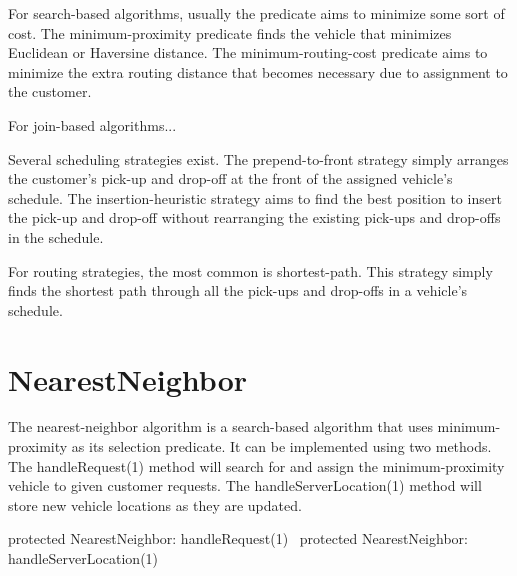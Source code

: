 For search-based algorithms, usually the predicate aims to minimize some sort
of cost. The minimum-proximity predicate finds the vehicle that minimizes
Euclidean or Haversine distance. The minimum-routing-cost predicate aims to
minimize the extra routing distance that becomes necessary due to assignment to
the customer.

For join-based algorithms...

Several scheduling strategies exist. The prepend-to-front strategy
simply arranges the customer's pick-up and drop-off at the front of the
assigned vehicle's schedule. The insertion-heuristic strategy aims to
find the best position to insert the pick-up and drop-off without
rearranging the existing pick-ups and drop-offs in the schedule.

For routing strategies, the most common is shortest-path. This strategy
simply finds the shortest path through all the pick-ups and drop-offs in a
vehicle's schedule.

\section{NearestNeighbor}

The nearest-neighbor algorithm is a search-based algorithm that uses
minimum-proximity as its selection predicate. It can be implemented using two
methods. The {\Tt{}handleRequest\nwendquote}(1) method will search for and assign the
minimum-proximity vehicle to given customer requests. The
{\Tt{}handleServerLocation\nwendquote}(1) method will store new vehicle locations as they are
updated.

\endmoddef\nwstartdeflinemarkup{}\nwenddeflinemarkup
protected \LA{}NearestNeighbor: handleRequest(1)~{\nwtagstyle{}}\RA{}
protected \LA{}NearestNeighbor: handleServerLocation(1)~{\nwtagstyle{}}\RA{}
\nwendcode{}

